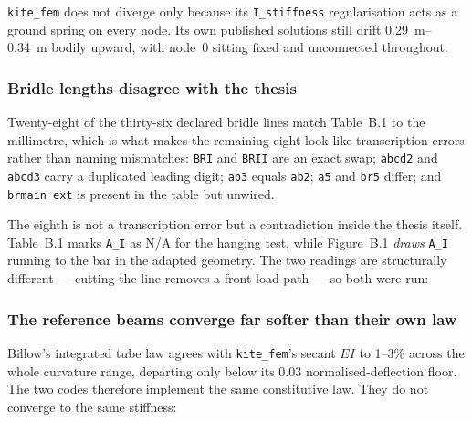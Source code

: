 \documentclass[11pt,a4paper]{article}
\begin{document}
\texttt{kite\_fem} does not diverge only because its \texttt{I\_stiffness}
regularisation acts as a ground spring on every node. Its own published
solutions still drift \SIrange{0.29}{0.34}{m} bodily upward, with node~0 sitting
fixed and unconnected throughout.

\subsubsection{Bridle lengths disagree with the thesis}

Twenty-eight of the thirty-six declared bridle lines match Table~B.1 to the
millimetre, which is what makes the remaining eight look like transcription
errors rather than naming mismatches: \texttt{BRI} and \texttt{BRII} are an
exact swap; \texttt{abcd2} and \texttt{abcd3} carry a duplicated leading digit;
\texttt{ab3} equals \texttt{ab2}; \texttt{a5} and \texttt{br5} differ; and
\texttt{brmain ext} is present in the table but unwired.

The eighth is not a transcription error but a contradiction inside the thesis
itself. Table~B.1 marks \texttt{A\_I} as N/A for the hanging test, while
Figure~B.1 \emph{draws} \texttt{A\_I} running to the bar in the adapted
geometry. The two readings are structurally different --- cutting the line
removes a front load path --- so both were run:

\begin{table}[htbp]
\centering
\caption{Three readings of the same source. Cutting \texttt{A\_I} is the most
accurate reading on the cases the model can solve and the worst overall,
because removing that load path is what lets the four centre-load cases fall
into a folded local minimum. No reading is adopted here: the ambiguity is a
finding about the source data, not something to settle by taking whichever
scores best.}

\end{table}

\subsubsection{The reference beams converge far softer than their own law}

Billow's integrated tube law agrees with \texttt{kite\_fem}'s secant $EI$ to
1--3\% across the whole curvature range, departing only below its
\num{0.03} normalised-deflection floor. The two codes therefore implement the
same constitutive law. They do not converge to the same stiffness:
\end{document}
